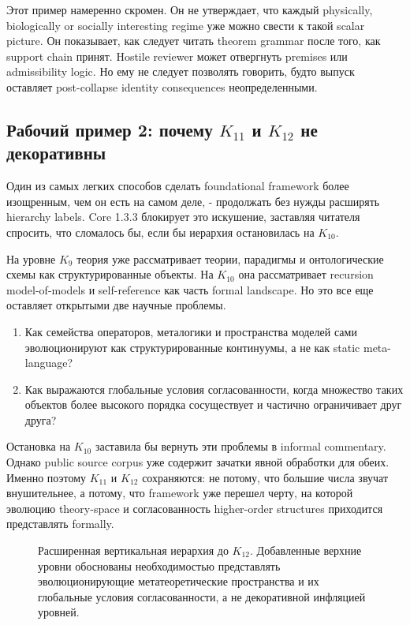 Этот пример намеренно скромен. Он не утверждает, что каждый physically,
biologically or socially interesting regime уже можно свести к такой
scalar picture. Он показывает, как следует читать theorem grammar после того,
как support chain принят. Hostile reviewer может отвергнуть premises или
admissibility logic. Но ему не следует позволять говорить, будто выпуск
оставляет post-collapse identity consequences неопределенными.

\subsection{Рабочий пример 2: почему \texorpdfstring{$K_{11}$}{K11} и \texorpdfstring{$K_{12}$}{K12} не декоративны}

Один из самых легких способов сделать foundational framework более
изощренным, чем он есть на самом деле, - продолжать без нужды расширять
hierarchy labels. Core 1.3.3 блокирует это искушение, заставляя читателя
спросить, что сломалось бы, если бы иерархия остановилась на \(K_{10}\).

На уровне \(K_9\) теория уже рассматривает теории, парадигмы и
онтологические схемы как структурированные объекты. На \(K_{10}\) она
рассматривает recursion model-of-models и self-reference как часть formal
landscape. Но это все еще оставляет открытыми две научные проблемы.

\begin{enumerate}
\item Как семейства операторов, металогики и пространства моделей сами
      эволюционируют как структурированные континуумы, а не как static
      meta-language?
\item Как выражаются глобальные условия согласованности, когда множество
      таких объектов более высокого порядка сосуществует и частично
      ограничивает друг друга?
\end{enumerate}

Остановка на \(K_{10}\) заставила бы вернуть эти проблемы в informal
commentary. Однако public source corpus уже содержит зачатки явной обработки
для обеих. Именно поэтому \(K_{11}\) и \(K_{12}\) сохраняются: не потому,
что большие числа звучат внушительнее, а потому, что framework уже перешел
черту, на которой эволюцию theory-space и согласованность higher-order
structures приходится представлять formally.

\begin{figure}[htbp]
\centering

\caption{Расширенная вертикальная иерархия до \(K_{12}\). Добавленные верхние
уровни обоснованы необходимостью представлять эволюционирующие
метатеоретические пространства и их глобальные условия согласованности, а не
декоративной инфляцией уровней.}
\label{fig:oc13-levels-k12}
\end{figure}

